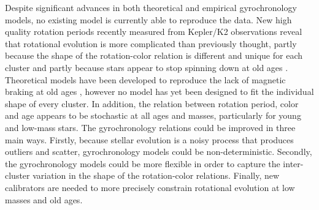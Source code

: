 Despite significant advances in both theoretical and empirical gyrochronology
models, no existing model is currently able to reproduce the data.
New high quality rotation periods recently measured from Kepler/K2
observations reveal that rotational evolution is more complicated than
previously thought, partly because the shape of the rotation-color relation is
different and unique for each cluster \citep{meibom2011, meibom2015,
rebull2016, douglas2016, rebull2017, douglas2017} and partly because stars
appear to stop spinning down at old ages \citep{angus2015, vansaders2016,
vansaders2018}.
Theoretical models have been developed to reproduce the lack of magnetic
braking at old ages \citep{vansaders2016, vansaders2018}, however no model has
yet been designed to fit the individual shape of every cluster.
In addition, the relation between rotation period, color and age appears to be
stochastic at all ages and masses, particularly for young and low-mass
stars.
The gyrochronology relations could be improved in three main ways.
Firstly,
because stellar evolution is a noisy process that produces outliers and
scatter, gyrochronology models could be non-deterministic.
Secondly, the gyrochronology models could be more flexible in order to
capture the inter-cluster variation in the shape of the rotation-color
relations.
Finally, new calibrators are needed to more precisely constrain rotational
evolution at low masses and old ages.


